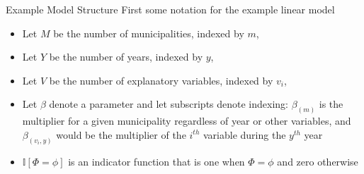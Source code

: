 \documentclass{beamer}
\begin{document}

\newcommand{\munis}{\ensuremath{m}\xspace}
\newcommand{\years}{\ensuremath{y}\xspace}
\newcommand{\vars}[1]{\ensuremath{v_{#1}}\xspace}
\newcommand{\indic}[2]{\ensuremath{\mathbb{I}\left[#1 = #2\right]}\xspace}
\begin{frame}{Example Model Structure}
First some notation for the example linear model
\begin{itemize}
\item Let $M$ be the number of municipalities, indexed by \munis,
\item Let $Y$ be the number of years, indexed by \years,
\item Let $V$ be the number of explanatory variables, indexed by \vars{i},
\item Let $\beta$ denote a parameter and let subscripts denote indexing: $\beta_{(\munis)}$ is the  multiplier for a given municipality regardless of year or other  variables, and $\beta_{(\vars{i}, \years)}$ would be the multiplier of the $i^{th}$ variable during the $\years^{th}$ year
\item \indic{\Phi}{\phi} is an indicator function that is one when $\Phi = \phi$ and zero otherwise
\end{itemize}
\end{frame}
\end{document}
